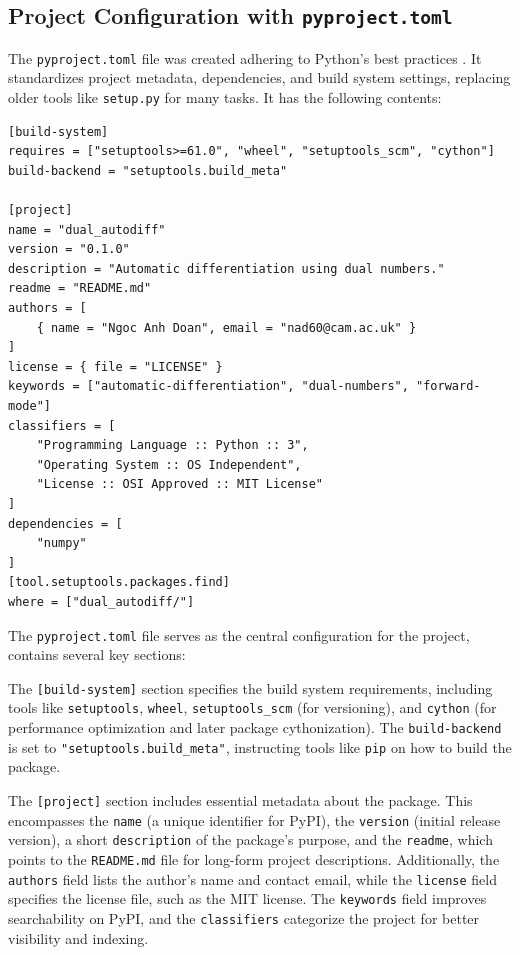 \documentclass[12.5pt]{article}
\begin{document}
\subsection{Project Configuration with \texttt{pyproject.toml}}
The \texttt{pyproject.toml} file was created adhering to Python's best practices \cite{WinNT}. It standardizes project metadata, dependencies, and build system settings, replacing older tools like \texttt{setup.py} for many tasks. It has the following contents: 
\begin{verbatim}
[build-system]
requires = ["setuptools>=61.0", "wheel", "setuptools_scm", "cython"]
build-backend = "setuptools.build_meta"

[project]
name = "dual_autodiff"
version = "0.1.0"
description = "Automatic differentiation using dual numbers."
readme = "README.md"
authors = [
    { name = "Ngoc Anh Doan", email = "nad60@cam.ac.uk" }
]
license = { file = "LICENSE" }
keywords = ["automatic-differentiation", "dual-numbers", "forward-mode"]
classifiers = [
    "Programming Language :: Python :: 3",
    "Operating System :: OS Independent",
    "License :: OSI Approved :: MIT License"
]
dependencies = [
    "numpy"
]
[tool.setuptools.packages.find]
where = ["dual_autodiff/"]
\end{verbatim}

The \texttt{pyproject.toml} file serves as the central configuration for the project, contains several key sections:

The \texttt{[build-system]} section specifies the build system requirements, including tools like \texttt{setuptools}, \texttt{wheel}, \texttt{setuptools\_scm} (for versioning), and \texttt{cython} (for performance optimization and later package cythonization). The \texttt{build-backend} is set to \texttt{"setuptools.build\_meta"}, instructing tools like \texttt{pip} on how to build the package.

The \texttt{[project]} section includes essential metadata about the package. This encompasses the \texttt{name} (a unique identifier for PyPI), the \texttt{version} (initial release version), a short \texttt{description} of the package's purpose, and the \texttt{readme}, which points to the \texttt{README.md} file for long-form project descriptions. Additionally, the \texttt{authors} field lists the author's name and contact email, while the \texttt{license} field specifies the license file, such as the MIT license. The \texttt{keywords} field improves searchability on PyPI, and the \texttt{classifiers} categorize the project for better visibility and indexing.
\end{document}
